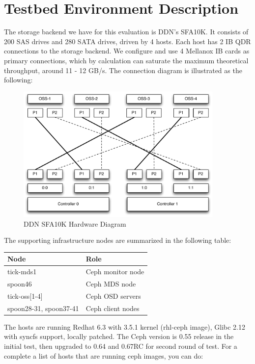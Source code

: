 \documentclass{article}
\begin{document}
\section{Testbed Environment Description}

The storage backend we have for this evaluation is DDN's SFA10K. It consists of
200 SAS drives and 280 SATA drives, driven by 4 hosts. Each host has 2 IB QDR
connections to the storage backend. We configure and use 4 Mellanox IB cards as
primary connections, which by calculation can saturate the maximum theoretical
throughput, around 11 - 12 GB/s. The connection diagram is illustrated as the
following:

\begin{figure}[htb]
\centering
\includegraphics[width=4in]{figs/sfa10k}
\caption{DDN SFA10K Hardware Diagram}
\end{figure}


The supporting infrastructure nodes are summarized in the following table:

\begin{table}[H]
\centering
    \begin{tabular}{ll}
    \toprule
    Node & Role \\
    \midrule
    tick-mds1 & Ceph monitor node \\
    spoon46 & Ceph MDS node \\
    tick-oss[1-4] & Ceph OSD servers \\
    spoon28-31, spoon37-41 & Ceph client nodes \\
    \bottomrule

    \end{tabular}

\end{table}

The hosts are running Redhat 6.3 with 3.5.1 kernel (rhl-ceph image), Glibc 2.12
with syncfs support, locally patched. The Ceph version is 0.55 release in the
initial test, then upgraded to 0.64 and 0.67RC for second round of test. For a
complete a list of hosts that are running ceph images, you can do:
\end{document}
